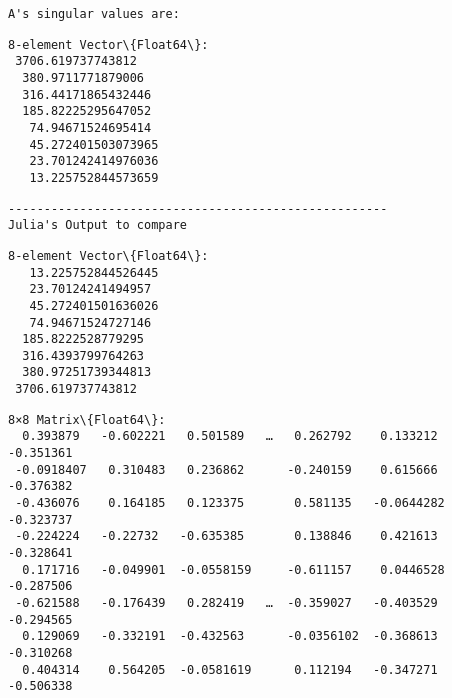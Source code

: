 \documentclass[11pt]{article}
\begin{document}
    
    \begin{Verbatim}[commandchars=\\\{\}]
A's singular values are:
    \end{Verbatim}

    
    \begin{Verbatim}[commandchars=\\\{\}]
8-element Vector\{Float64\}:
 3706.619737743812
  380.9711771879006
  316.44171865432446
  185.82225295647052
   74.94671524695414
   45.272401503073965
   23.701242414976036
   13.225752844573659
    \end{Verbatim}

    
    \begin{Verbatim}[commandchars=\\\{\}]
-----------------------------------------------------
Julia's Output to compare
    \end{Verbatim}

    
    \begin{Verbatim}[commandchars=\\\{\}]
8-element Vector\{Float64\}:
   13.225752844526445
   23.70124241494957
   45.272401501636026
   74.94671524727146
  185.8222528779295
  316.4393799764263
  380.97251739344813
 3706.619737743812
    \end{Verbatim}

    
    
    \begin{Verbatim}[commandchars=\\\{\}]
8×8 Matrix\{Float64\}:
  0.393879   -0.602221   0.501589   …   0.262792    0.133212   -0.351361
 -0.0918407   0.310483   0.236862      -0.240159    0.615666   -0.376382
 -0.436076    0.164185   0.123375       0.581135   -0.0644282  -0.323737
 -0.224224   -0.22732   -0.635385       0.138846    0.421613   -0.328641
  0.171716   -0.049901  -0.0558159     -0.611157    0.0446528  -0.287506
 -0.621588   -0.176439   0.282419   …  -0.359027   -0.403529   -0.294565
  0.129069   -0.332191  -0.432563      -0.0356102  -0.368613   -0.310268
  0.404314    0.564205  -0.0581619      0.112194   -0.347271   -0.506338
    \end{Verbatim}

    
    
\end{document}
